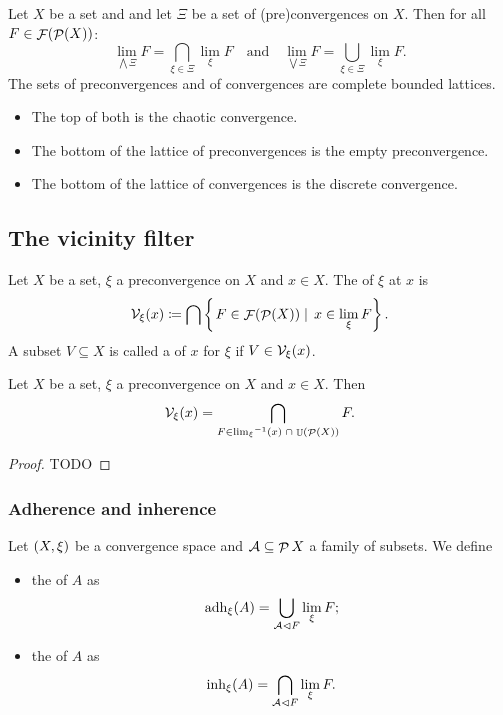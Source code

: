 \begin{proposition} \label{latticeConvergences}
Let $X$ be a set and and let $\Xi$ be a set of (pre)convergences on $X$. Then for all $F \in \mathop{\mathcal{F}}(\mathop{\mathcal{P}}(X))$:
\[ \lim_{\bigwedge \Xi} F = \bigcap_{\xi\in\Xi}\lim_\xi F \quad\text{and}\quad \lim_{\bigvee \Xi} F = \bigcup_{\xi\in\Xi}\lim_\xi F. \]
The sets of preconvergences and of convergences are complete bounded lattices.
\begin{itemize}
\item The top of both is the chaotic convergence.
\item The bottom of the lattice of preconvergences is the empty preconvergence.
\item The bottom of the lattice of convergences is the discrete convergence.
\end{itemize}
\end{proposition}


\subsection{The vicinity filter}
\begin{definition}
Let $X$ be a set, $\xi$ a preconvergence on $X$ and $x\in X$. The  of $\xi$ at $x$ is
\[ \mathcal{V}_\xi(x) \coloneqq \bigcap \left\{\left. F\in \mathop{\mathcal{F}}(\mathop{\mathcal{P}}(X)) \;\right|\; x\in \lim_\xi F \right\}. \]
A subset $V\subseteq X$ is called a  of $x$ for $\xi$ if $V\in \mathcal{V}_\xi(x)$.
\end{definition}

\begin{lemma}
Let $X$ be a set, $\xi$ a preconvergence on $X$ and $x\in X$. Then
\[ \mathcal{V}_\xi(x) = \bigcap_{F\in {\lim_\xi}^{-1}(x)\;\cap\; \mathop{\mathbb{U}}(\mathop{\mathcal{P}}(X))}F. \]
\end{lemma}
\begin{proof}
TODO
\end{proof}

\subsubsection{Adherence and inherence}
\begin{definition}
Let $\left( X,\xi \right)$ be a convergence space and $\mathcal{A}\subseteq \mathop{\mathcal{P}}{X}$ a family of subsets. We define
\begin{itemize}
\item the  of $A$ as
\[ \operatorname{adh}_\xi(A) = \bigcup_{\mathcal{A}\lhd F}\lim_\xi F; \]
\item the  of $A$ as
\[ \operatorname{inh}_\xi(A) = \bigcap_{\mathcal{A}\lhd F}\lim_\xi F. \]
\end{itemize}
\end{definition}

